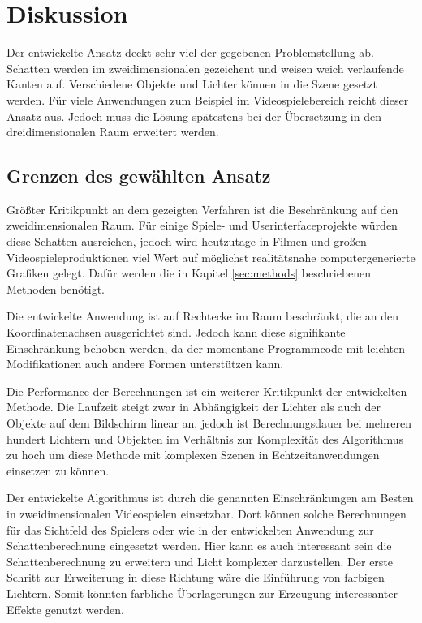 \section{Diskussion}

Der entwickelte Ansatz deckt sehr viel der gegebenen Problemstellung ab. Schatten werden im zweidimensionalen gezeichent
und weisen weich verlaufende Kanten auf. Verschiedene Objekte und Lichter können in die Szene gesetzt
werden. Für viele Anwendungen zum Beispiel im Videospielebereich reicht dieser Ansatz aus. Jedoch
muss die Lösung spätestens bei der Übersetzung in den dreidimensionalen Raum erweitert werden.

\subsection{Grenzen des gewählten Ansatz}

Größter Kritikpunkt an dem gezeigten Verfahren ist die Beschränkung auf den zweidimensionalen Raum.
Für einige Spiele- und Userinterfaceprojekte würden diese Schatten ausreichen, jedoch wird heutzutage in Filmen und großen Videospieleproduktionen
viel Wert auf möglichst realitätsnahe computergenerierte Grafiken
gelegt. Dafür werden die in Kapitel \ref{sec:methods} beschriebenen Methoden benötigt.

Die entwickelte Anwendung ist auf Rechtecke im Raum beschränkt, die an den Koordinatenachsen
ausgerichtet sind. Jedoch kann diese signifikante Einschränkung behoben werden, da der
momentane Programmcode mit leichten Modifikationen auch andere Formen unterstützen kann.

Die Performance der Berechnungen ist ein weiterer Kritikpunkt der entwickelten Methode. Die Laufzeit
steigt zwar in Abhängigkeit der Lichter als auch der Objekte auf dem Bildschirm linear an, jedoch
ist Berechnungsdauer bei mehreren hundert Lichtern und Objekten im Verhältnis zur Komplexität des
Algorithmus zu hoch um diese Methode mit komplexen Szenen in Echtzeitanwendungen einsetzen zu können.

Der entwickelte Algorithmus ist durch die genannten Einschränkungen am Besten in zweidimensionalen
Videospielen einsetzbar. Dort können solche Berechnungen für das Sichtfeld des Spielers oder wie in
der entwickelten Anwendung zur Schattenberechnung eingesetzt werden. Hier kann es auch interessant
sein die Schattenberechnung zu erweitern und Licht komplexer darzustellen. Der erste Schritt zur
Erweiterung in diese Richtung wäre die Einführung von farbigen Lichtern. Somit könnten farbliche
Überlagerungen zur Erzeugung interessanter Effekte genutzt werden.


